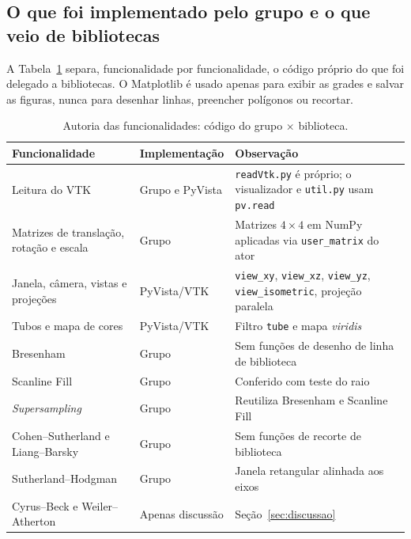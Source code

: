 \documentclass[11pt, a4paper]{article}
\begin{document}
\subsection{O que foi implementado pelo grupo e o que veio de bibliotecas}
A Tabela~\ref{tab:autoria} separa, funcionalidade por funcionalidade, o código próprio do que foi delegado a bibliotecas. O Matplotlib é usado apenas para exibir as grades e salvar as figuras, nunca para desenhar linhas, preencher polígonos ou recortar.

\begin{table}[htbp]
  \centering
  \small
  \caption{Autoria das funcionalidades: código do grupo $\times$ biblioteca.}
  \label{tab:autoria}
  \begin{tabularx}{\textwidth}{>{\raggedright\arraybackslash}p{4.3cm} >{\raggedright\arraybackslash}p{3.6cm} X}
    \toprule
    \textbf{Funcionalidade} & \textbf{Implementação} & \textbf{Observação} \\
    \midrule
    Leitura do VTK & Grupo e PyVista & \texttt{readVtk.py} é próprio; o visualizador e \texttt{util.py} usam \texttt{pv.read} \\
    Matrizes de translação, rotação e escala & Grupo & Matrizes $4\times4$ em NumPy aplicadas via \texttt{user\_matrix} do ator \\
    Janela, câmera, vistas e projeções & PyVista/VTK & \texttt{view\_xy}, \texttt{view\_xz}, \texttt{view\_yz}, \texttt{view\_isometric}, projeção paralela \\
    Tubos e mapa de cores & PyVista/VTK & Filtro \texttt{tube} e mapa \emph{viridis} \\
    Bresenham & Grupo & Sem funções de desenho de linha de biblioteca \\
    Scanline Fill & Grupo & Conferido com teste do raio \\
    \emph{Supersampling} & Grupo & Reutiliza Bresenham e Scanline Fill \\
    Cohen--Sutherland e Liang--Barsky & Grupo & Sem funções de recorte de biblioteca \\
    Sutherland--Hodgman & Grupo & Janela retangular alinhada aos eixos \\
    Cyrus--Beck e Weiler--Atherton & Apenas discussão & Seção~\ref{sec:discussao} \\
    \bottomrule
  \end{tabularx}
\end{table}
\end{document}
